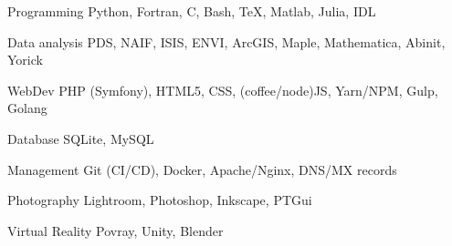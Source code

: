 
\begin{cvskills}

	\cvskill
	{Programming}
    {Python, Fortran, C, Bash, \TeX, Matlab, Julia, IDL}

	\cvskill
	{Data analysis}
    {PDS, NAIF, ISIS, ENVI, ArcGIS, Maple, Mathematica, Abinit, Yorick}

	\cvskill
    {WebDev}
    {PHP (Symfony), HTML5, CSS, (coffee/node)JS, Yarn/NPM, Gulp, Golang}

	\cvskill
    {Database}
    {SQLite, MySQL}

	\cvskill
    {Management}
    {Git (CI/CD), Docker, Apache/Nginx, DNS/MX records}

	\cvskill
    {Photography}
    {Lightroom, Photoshop, Inkscape, PTGui}

    \cvskill
    {Virtual Reality}
    {Povray, Unity, Blender}

\end{cvskills}
